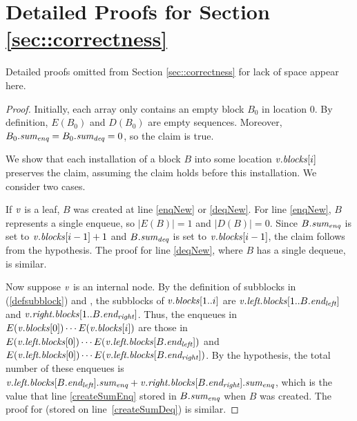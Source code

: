 
\section{Detailed Proofs for Section \ref{sec::correctness}}
\label{app::tracingDetails}

Detailed proofs omitted from Section \ref{sec::correctness} for lack of space appear here.

\sumRes*
\begin{proof}
Initially, each  array only contains an empty block $B_0$ in location 0.
By definition, $E(B_0)$ and $D(B_0)$ are empty sequences.
Moreover, $B_0.\mbox{\textit{sum\textsubscript{enq}}} = B_0.\mbox{\textit{sum\textsubscript{deq}}} = 0$, so the claim is true.

We show that each installation of a block $B$ into some location $\mbox{\textnormal{\textit{v}}}.\mbox{\textit{blocks}}[i]$ preserves the claim,
assuming the claim holds before this installation.  We consider two cases.

If $\mbox{\textnormal{\textit{v}}}$ is a leaf, $B$ was created at line \ref{enqNew} or \ref{deqNew}.
For line \ref{enqNew}, $B$ represents a single enqueue, so $|E(B)|=1$ and $|D(B)|=0$.
Since $B.\mbox{\textit{sum\textsubscript{enq}}}$ is set to $\mbox{\textnormal{\textit{v}}}.\mbox{\textit{blocks}}[i-1]+1$ and
$B.\mbox{\textit{sum\textsubscript{deq}}}$ is set to $\mbox{\textnormal{\textit{v}}}.\mbox{\textit{blocks}}[i-1]$, the claim follows from the hypothesis.
The proof for line \ref{deqNew}, where $B$ has a single dequeue, is similar.

Now suppose $\mbox{\textnormal{\textit{v}}}$ is an internal node. By the definition of subblocks in (\ref{defsubblock}) and , the
subblocks of $\mbox{\textnormal{\textit{v}}}.\mbox{\textit{blocks}}[1..i]$ are $\mbox{\textnormal{\textit{v}}}.\mbox{\textit{left.blocks}}[1..B.\mbox{\textit{end\textsubscript{left}}}]$ 
and $\mbox{\textnormal{\textit{v}}}.\mbox{\textit{right.blocks}}[1..B.\mbox{\textit{end\textsubscript{right}}}]$.
Thus, the enqueues in $E(\mbox{\textnormal{\textit{v}}}.\mbox{\textit{blocks}}[0])\cdots E(\mbox{\textnormal{\textit{v}}}.\mbox{\textit{blocks}}[i])$ are those in
$E(\mbox{\textnormal{\textit{v}}}.\mbox{\textit{left.blocks}}[0]) \cdots E(\mbox{\textnormal{\textit{v}}}.\mbox{\textit{left.blocks}}[B.\mbox{\textit{end\textsubscript{left}}}])$ and
$E(\mbox{\textnormal{\textit{v}}}.\mbox{\textit{left.blocks}}[0]) \cdots E(\mbox{\textnormal{\textit{v}}}.\mbox{\textit{left.blocks}}[B.\mbox{\textit{end\textsubscript{right}}}])$.
By the hypothesis, the total number of these enqueues is $\mbox{\textnormal{\textit{v}}}.\mbox{\textit{left.blocks}}[B.\mbox{\textit{end\textsubscript{left}}}].\mbox{\textit{sum\textsubscript{enq}}} + \mbox{\textnormal{\textit{v}}}.\mbox{\textit{right.blocks}}[B.\mbox{\textit{end\textsubscript{right}}}].\mbox{\textit{sum\textsubscript{enq}}}$, which is the value that line \ref{createSumEnq} stored in $B.\mbox{\textit{sum\textsubscript{enq}}}$ when $B$ was created.
The proof for  (stored on line~\ref{createSumDeq}) is similar.
\end{proof}

